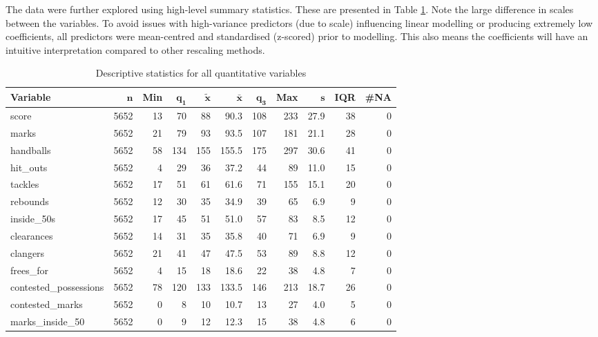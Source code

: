 \documentclass{article}
\begin{document}
The data were further explored using high-level summary statistics. These are presented in Table \ref{tab:summarystats}. Note the large difference in scales between the variables. To avoid issues with high-variance predictors (due to scale) influencing linear modelling or producing extremely low coefficients, all predictors were mean-centred and standardised (z-scored) prior to modelling. This also means the coefficients will have an intuitive interpretation compared to other rescaling methods.

\begin{table}[ht]
\centering
\begingroup\footnotesize
\begin{tabular}{lrrrrrrrrrr}
 \textbf{Variable} & $\mathbf{n}$ & \textbf{Min} & $\mathbf{q_1}$ & $\mathbf{\widetilde{x}}$ & $\mathbf{\bar{x}}$ & $\mathbf{q_3}$ & \textbf{Max} & $\mathbf{s}$ & \textbf{IQR} & \textbf{\#NA} \\ 
  \hline
score & 5652 & 13 &  70 &  88 &  90.3 & 108 & 233 & 27.9 & 38 & 0 \\ 
  marks & 5652 & 21 &  79 &  93 &  93.5 & 107 & 181 & 21.1 & 28 & 0 \\ 
  handballs & 5652 & 58 & 134 & 155 & 155.5 & 175 & 297 & 30.6 & 41 & 0 \\ 
  hit\_outs & 5652 &  4 &  29 &  36 &  37.2 &  44 &  89 & 11.0 & 15 & 0 \\ 
  tackles & 5652 & 17 &  51 &  61 &  61.6 &  71 & 155 & 15.1 & 20 & 0 \\ 
  rebounds & 5652 & 12 &  30 &  35 &  34.9 &  39 &  65 &  6.9 &  9 & 0 \\ 
  inside\_50s & 5652 & 17 &  45 &  51 &  51.0 &  57 &  83 &  8.5 & 12 & 0 \\ 
  clearances & 5652 & 14 &  31 &  35 &  35.8 &  40 &  71 &  6.9 &  9 & 0 \\ 
  clangers & 5652 & 21 &  41 &  47 &  47.5 &  53 &  89 &  8.8 & 12 & 0 \\ 
  frees\_for & 5652 &  4 &  15 &  18 &  18.6 &  22 &  38 &  4.8 &  7 & 0 \\ 
  contested\_possessions & 5652 & 78 & 120 & 133 & 133.5 & 146 & 213 & 18.7 & 26 & 0 \\ 
  contested\_marks & 5652 &  0 &   8 &  10 &  10.7 &  13 &  27 &  4.0 &  5 & 0 \\ 
  marks\_inside\_50 & 5652 &  0 &   9 &  12 &  12.3 &  15 &  38 &  4.8 &  6 & 0 \\ 
  \end{tabular}
\endgroup
\caption{Descriptive statistics for all quantitative variables} 
\label{tab:summarystats}
\end{table}
\end{document}
